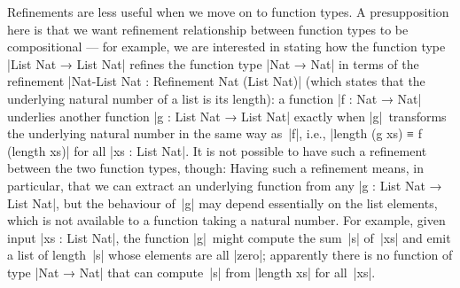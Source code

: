 Refinements are less useful when we move on to function types.
A presupposition here is that we want refinement relationship between function types to be compositional --- for example, we are interested in stating how the function type |List Nat → List Nat| refines the function type |Nat → Nat| in terms of the refinement |Nat-List Nat : Refinement Nat (List Nat)| (which states that the underlying natural number of a list is its length): a function |f : Nat → Nat| underlies another function |g : List Nat → List Nat| exactly when |g|~transforms the underlying natural number in the same way as~|f|, i.e., |length (g xs) ≡ f (length xs)| for all |xs : List Nat|.
It is not possible to have such a refinement between the two function types, though:
Having such a refinement means, in particular, that we can extract an underlying function from any |g : List Nat → List Nat|, but the behaviour of~|g| may depend essentially on the list elements, which is not available to a function taking a natural number.
For example, given input |xs : List Nat|, the function |g|~might compute the sum~|s| of~|xs| and emit a list of length~|s| whose elements are all |zero|; apparently there is no function of type |Nat → Nat| that can compute~|s| from |length xs| for all~|xs|.

